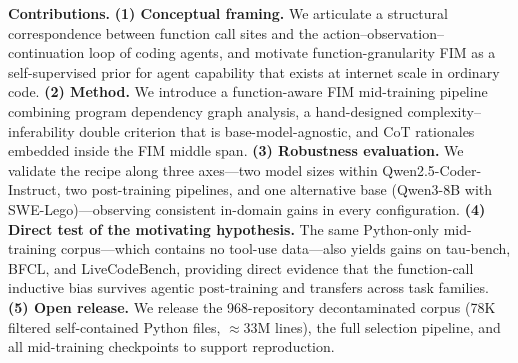 \textbf{Contributions.}
\textbf{(1) Conceptual framing.} We articulate a structural correspondence
between function call sites and the action--observation--continuation loop
of coding agents, and motivate function-granularity FIM as a
self-supervised prior for agent capability that exists at internet scale
in ordinary code.
\textbf{(2) Method.} We introduce a function-aware FIM mid-training
pipeline combining program dependency graph analysis, a hand-designed
complexity--inferability double criterion that is base-model-agnostic, and
CoT rationales embedded inside the FIM middle span.
\textbf{(3) Robustness evaluation.} We validate the recipe along three
axes---two model sizes within Qwen2.5-Coder-Instruct, two post-training
pipelines, and one alternative base (Qwen3-8B with SWE-Lego)---observing
consistent in-domain gains in every configuration.
\textbf{(4) Direct test of the motivating hypothesis.} The same Python-only
mid-training corpus---which contains no tool-use data---also yields gains
on tau-bench, BFCL, and LiveCodeBench, providing direct evidence that the
function-call inductive bias survives agentic post-training and transfers
across task families.
\textbf{(5) Open release.} We release the 968-repository decontaminated
corpus (78K filtered self-contained Python files, $\approx 33\mathrm{M}$
lines), the full selection pipeline, and all mid-training checkpoints to
support reproduction.